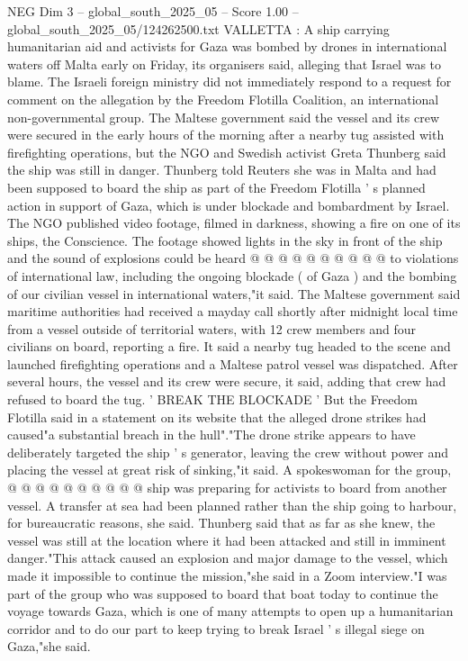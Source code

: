 \begin{textsample}{NEG Dim 3 – global\_south\_2025\_05 – Score 1.00 – global\_south\_2025\_05/124262500.txt}  \label{ex:f3_neg_224}
VALLETTA : A ship carrying humanitarian aid and activists for Gaza was bombed by drones in international waters off Malta early on Friday, its organisers said, alleging that Israel was to blame.
The Israeli foreign ministry did not immediately respond to a request for comment on the allegation by the Freedom Flotilla Coalition, an international non-governmental group.
The Maltese government said the vessel and its crew were secured in the early hours of the morning after a nearby tug assisted with firefighting operations, but the NGO and Swedish activist Greta Thunberg said the ship was still in danger.
Thunberg told Reuters she was in Malta and had been supposed to board the ship as part of the Freedom Flotilla ' s planned action in support of Gaza, which is under blockade and bombardment by Israel.
The NGO published video footage, filmed in darkness, showing a fire on one of its ships, the Conscience.
The footage showed lights in the sky in front of the ship and the sound of explosions could be heard @ @ @ @ @ @ @ @ @ @ to violations of international law, including the ongoing blockade ( of Gaza ) and the bombing of our civilian vessel in international waters,"it said.
The Maltese government said maritime authorities had received a mayday call shortly after midnight local time from a vessel outside of territorial waters, with 12 crew members and four civilians on board, reporting a fire.
It said a nearby tug headed to the scene and launched firefighting operations and a Maltese patrol vessel was dispatched.
After several hours, the vessel and its crew were secure, it said, adding that crew had refused to board the tug. ' BREAK THE BLOCKADE ' But the Freedom Flotilla said in a statement on its website that the alleged drone strikes had caused"a substantial breach in the hull"."The drone strike appears to have deliberately targeted the ship ' s generator, leaving the crew without power and placing the vessel at great risk of sinking,"it said.
A spokeswoman for the group, @ @ @ @ @ @ @ @ @ @ ship was preparing for activists to board from another vessel.
A transfer at sea had been planned rather than the ship going to harbour, for bureaucratic reasons, she said.
Thunberg said that as far as she knew, the vessel was still at the location where it had been attacked and still in imminent danger."This attack caused an explosion and major damage to the vessel, which made it impossible to continue the mission,"she said in a Zoom interview."I was part of the group who was supposed to board that boat today to continue the voyage towards Gaza, which is one of many attempts to open up a humanitarian corridor and to do our part to keep trying to break Israel ' s illegal siege on Gaza,"she said.

\end{textsample}
